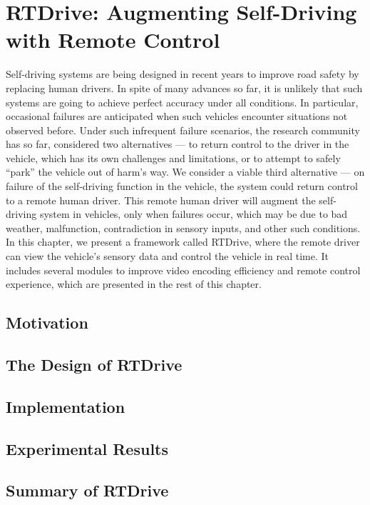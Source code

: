 


\chapter{RTDrive: Augmenting Self-Driving with Remote Control}
\label{chapter_rtdrive}

Self-driving systems are being designed in recent years 
to improve road safety by replacing human drivers. 
In spite of many advances so far, it is unlikely that such systems are
going to achieve perfect accuracy under all conditions. In
particular, occasional failures are anticipated when such vehicles
encounter situations not observed before. Under such
infrequent failure scenarios, the research community has so
far, considered two alternatives — to return control to the
driver in the vehicle, which has its own challenges and limitations,
or to attempt to safely “park” the vehicle out of
harm’s way. We consider a viable third alternative — on
failure of the self-driving function in the vehicle, the system
could return control to a remote human driver. This remote
human driver will augment the self-driving system in vehicles,
only when failures occur, which may be due to bad
weather, malfunction, contradiction in sensory inputs, and
other such conditions.
In this chapter, we present a framework called
RTDrive, where the remote driver can view the vehicle’s sensory
data and control the vehicle in real time.
It includes several modules to improve video encoding
efficiency and remote control experience, which are
presented in the rest of this chapter. 


\section{Motivation}




\section{The Design of RTDrive}





\section{Implementation}




\section{Experimental Results}




\section{Summary of RTDrive}










